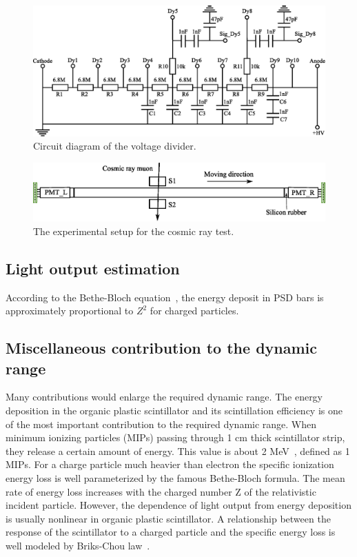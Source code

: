 \documentclass[5p, times]{elsarticle}
\begin{document}
\begin{figure}
\centering
 \includegraphics[width=140mm]{divider}
\caption{Circuit diagram of the voltage divider.}
\label{fig:divider}
\end{figure} 

\begin{figure}[t]
 \centering
 \includegraphics[width=140mm]{cosmic_test}
\caption{The experimental setup for the cosmic ray test.}
\label{fig:cosmic_test}
\end{figure} 

\subsection{Light output estimation}
According to the Bethe-Bloch equation~\cite{olive_review_2014}, the energy deposit in PSD bars is approximately proportional to $Z^2$ for charged particles.

\subsection{Miscellaneous contribution to the dynamic range}

Many contributions would enlarge the required dynamic range. 
The energy deposition in the organic plastic scintillator and its scintillation efficiency is one of the most important contribution to the required dynamic range. 
When minimum ionizing particles (MIPs) passing through 1 cm thick scintillator strip, they release a certain amount of energy. 
This value is about 2 MeV~\cite{olive_review_2014}, defined as 1 MIPs. 
For a charge particle much heavier than electron the specific ionization energy loss is well parameterized by the famous Bethe-Bloch formula. 
The mean rate of energy loss increases with the charged number Z of the relativistic incident particle. 
However, the dependence of light output from energy deposition is usually nonlinear in organic plastic scintillator. 
A relationship between the response of the scintillator to a charged particle and the specific energy loss is well modeled by Briks-Chou law~\cite{birks1951scintillations,birks1964theory}. 
\end{document}
